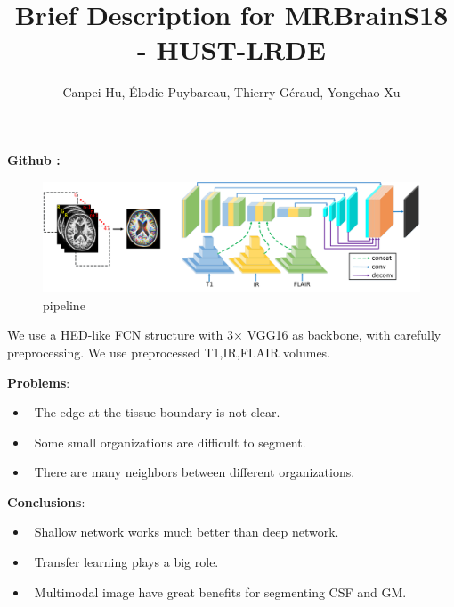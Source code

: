 \documentclass{article}
\begin{document}

\begin{spacing}{1.4}
    \author{Canpei Hu, \'Elodie Puybareau, Thierry G\'eraud, Yongchao Xu}
    \title{Brief Description for MRBrainS18 - HUST-LRDE}
    \maketitle 
\setlength{\parindent}{2em}

\vspace{-3em}
\begin{center}
    \textbf{Github : }
\end{center}
\vspace{-.5em}

\begin{figure}[H]
    \centering
    \includegraphics[width=\textwidth]{./imgs/pipeline.png}
    \caption{pipeline}
    \label{fig:pipeline}
\end{figure}

We use a HED-like\cite{Xie2016Holistically} FCN structure with 3$\times$ VGG16 as backbone, with carefully preprocessing. 
We use preprocessed T1,IR,FLAIR volumes. 

\textbf{Problems}:
\begin{itemize}
    \item ~The edge at the tissue boundary is not clear. 
    \item ~Some small organizations are difficult to segment.
    \item ~There are many neighbors between different organizations.
\end{itemize}

\textbf{Conclusions}:
\begin{itemize}
    \item ~Shallow network works much better than deep network. 
    \item ~Transfer learning plays a big role. 
    \item ~Multimodal image have great benefits for segmenting CSF and GM.
\end{itemize}


\end{spacing}
\end{document}
